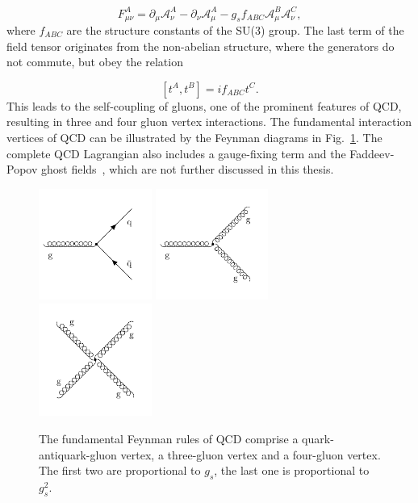 \begin{equation*}
    F_{\mu\nu}^A = \partial_\mu \mathcal{A}_\nu^A - \partial_{\nu}
    \mathcal{A}_{\mu}^A - g_s f_{ABC} \mathcal{A}_{\mu}^B
    \mathcal{A}_{\nu}^C,
\end{equation*}
%
where $f_{ABC}$ are the structure constants of the SU(3) group. The last term of
the field tensor originates from the non-abelian structure, where the generators
do not commute, but obey the relation

\begin{equation*}
    \left[t^A, t^B \right] = if_{ABC} t^{C}.
\end{equation*}
%
This leads to the self-coupling of gluons, one of the prominent features of QCD,
resulting in three and four gluon vertex interactions. The fundamental
interaction vertices of QCD can be illustrated by the Feynman diagrams in
Fig.~\ref{fig:fundamental_couplings}. The complete QCD Lagrangian also includes
a gauge-fixing term and the Faddeev-Popov ghost fields~\cite{Faddeev:1967fc},
which are not further discussed in this thesis.

\begin{figure}[htb] 
    \centering
    \includegraphics[width=0.33\textwidth]{figures/drawings/feynman/gqq.pdf}\hfill
    \includegraphics[width=0.33\textwidth]{figures/drawings/feynman/ggg.pdf}\hfill
    \includegraphics[width=0.33\textwidth]{figures/drawings/feynman/gggg.pdf}\hfill
    \caption[Fundamental vertices of QCD]{The fundamental Feynman rules of QCD
    comprise a quark-antiquark-gluon vertex, a three-gluon vertex and a four-gluon
    vertex. The first two are proportional to $g_{s}$, the last one is
    proportional to $g_{s}^2$.} 
    \label{fig:fundamental_couplings} 
\end{figure}

